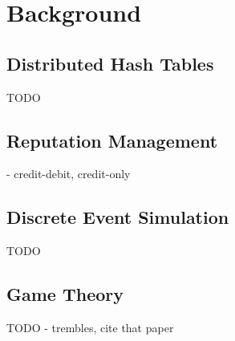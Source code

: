 \chapter{Background}
\section{Distributed Hash Tables}
TODO
\section{Reputation Management}
- credit-debit, credit-only
\section{Discrete Event Simulation}
TODO
\section{Game Theory}
TODO
- trembles, cite that paper
